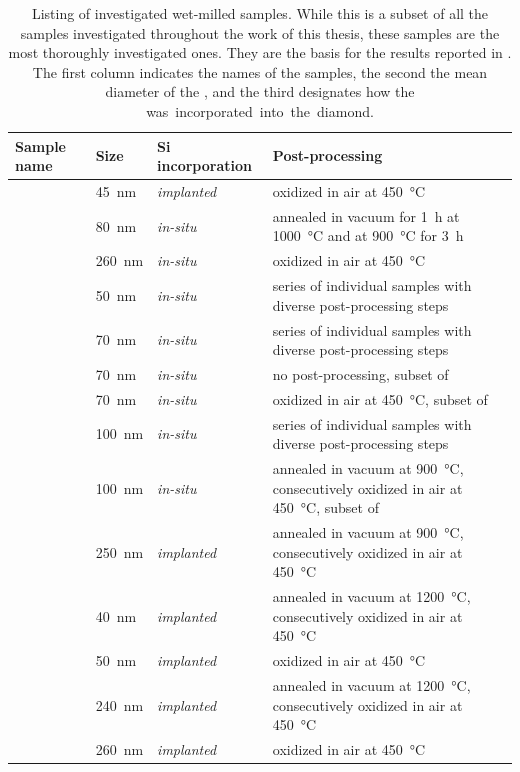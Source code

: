 		\begin{table}[H]
			 \centering

				\begin{tabularx}{\linewidth}{@{} *3l X @{}}
				 \toprule
				 Sample name & Size & Si incorporation & Post-processing \\
				 \midrule
				 \hphtimpfortyfive & \SI{45}{nm} & \textit{implanted} & oxidized in air at \SI{450}{\celsius}\\ \hline
				 \hphtimpeighty & \SI{80}{nm} & \textit{in-situ} &annealed in vacuum for \SI{1}{\hour} at \SI{1000}{\celsius} and at \SI{900}{\celsius} for \SI{3}{\hour}\\ \hline
				 \hphtimptwosixty & \SI{260}{nm} & \textit{in-situ} & oxidized in air at \SI{450}{\celsius}\\ \hline
				 \insituF & \SI{50}{nm} & \textit{in-situ} &series of individual samples with diverse post-processing steps\\ \hline
				 \insituS & \SI{70}{nm} & \textit{in-situ} &series of individual samples with diverse post-processing steps\\ \hline
				 \insituSn & \SI{70}{nm} & \textit{in-situ} & no post-processing, subset of \insituS \\ \hline
				 \insituSo & \SI{70}{nm} & \textit{in-situ} &oxidized in air at \SI{450}{\celsius}, subset of \insituS \\ \hline
				 \insituH & \SI{100}{nm} & \textit{in-situ} &series of individual samples with diverse post-processing steps\\ \hline
				 \insituHao & \SI{100}{nm} & \textit{in-situ} &annealed in vacuum at \SI{900}{\celsius}, consecutively oxidized in air at \SI{450}{\celsius}, subset of \insituH \\ \hline
				 \implantedTao & \SI{250}{nm} &  \textit{implanted}  &annealed in vacuum at \SI{900}{\celsius}, consecutively oxidized in air at \SI{450}{\celsius}\\ \hline
				 \milltwofortyann & \SI{40}{nm} &  \textit{implanted}  &annealed in vacuum at \SI{1200}{\celsius}, consecutively oxidized in air at \SI{450}{\celsius}\\ \hline
				 \milltwofiftyno & \SI{50}{nm} &  \textit{implanted}  & oxidized in air at \SI{450}{\celsius}\\ \hline
				 \milltwotwofortyann & \SI{240}{nm} &  \textit{implanted}  &annealed in vacuum at \SI{1200}{\celsius}, consecutively oxidized in air at \SI{450}{\celsius}\\ \hline
				 \milltwotwosixtyno & \SI{260}{nm} &  \textit{implanted}  & oxidized in air at \SI{450}{\celsius}\\
				 \bottomrule
				 \end{tabularx}
				 \caption[Listing of investigated wet-milled samples]{Listing of investigated wet-milled samples. While this is a subset of all the samples investigated throughout the work of this thesis, these samples are the most thoroughly investigated ones. They are the basis for the results reported in . The first column indicates the names of the samples, the second the mean diameter of the \nds, and the third designates how the \si was incorporated into the diamond.} \label{tab::samplenames}
		\end{table}
